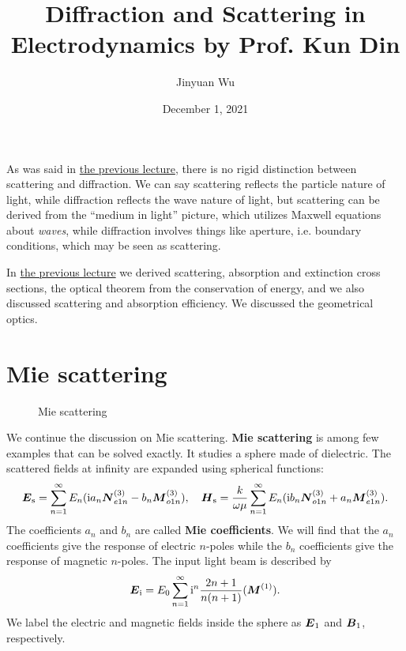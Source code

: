 \documentclass[hyperref, a4paper]{article}
\title{Diffraction and Scattering in Electrodynamics by Prof. Kun Din}
\author{Jinyuan Wu}
\date{December 1, 2021}
\newcommand*{\ii}{\mathrm{i}}
\newcommand*{\concept}[1]{{\textbf{#1}}}
\begin{document}
\maketitle

As was said in \href{lecture-11-24.pdf}{the previous lecture}, there is no rigid distinction between  
scattering and diffraction. We can say scattering reflects the particle nature of light, while 
diffraction reflects the wave nature of light, but scattering can be derived from the ``medium in 
light'' picture, which utilizes Maxwell equations about \emph{waves}, while diffraction involves 
things like aperture, i.e. boundary conditions, which may be seen as scattering. 

In \href{lecture-11-24.pdf}{the previous lecture} we derived scattering, absorption and extinction 
cross sections, the optical theorem from the conservation of energy, and we also discussed scattering 
and absorption efficiency. We discussed the geometrical optics.

\section{Mie scattering}

\begin{figure}
    \centering
    
    \caption{Mie scattering}
\end{figure}

We continue the discussion on Mie scattering.
\concept{Mie scattering} is among few examples that can be solved exactly. It studies a sphere made of 
dielectric. The scattered fields at infinity are expanded using spherical functions:
\begin{equation}
    \vb*{E}_\text{s} = \sum_{n=1}^\infty E_n (\ii a_n \vb*{N}^{(3)}_{e1n} - b_n \vb*{M}^{(3)}_{o1n}), \quad 
    \vb*{H}_\text{s} = \frac{k}{\omega \mu} \sum_{n=1}^\infty E_n (\ii b_n \vb*{N}^{(3)}_{o1n} + a_n \vb*{M}^{(3)}_{e1n}).
    \label{eq:scattered-beam}
\end{equation}
The coefficients $a_n$ and $b_n$ are called \concept{Mie coefficients}. We will find that the $a_n$ coefficients
give the response of electric $n$-poles while the $b_n$ coefficients give the response of magnetic $n$-poles.
The input light beam is described by 
\begin{equation}
    \vb*{E}_\text{i} = E_0 \sum_{n=1}^\infty \ii^n \frac{2n+1}{n(n+1)} (\vb*{M}^{(1)}).
    \label{eq:input-beam}
\end{equation}
We label the electric and magnetic fields inside the sphere as $\vb*{E}_1$ and $\vb*{B}_1$, respectively.
\end{document}
